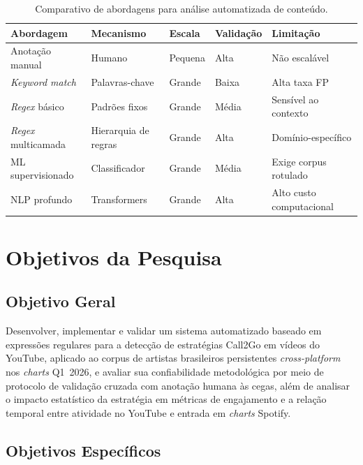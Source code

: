 ﻿\documentclass[12pt]{article}
\begin{document}
\begin{table}[H]
\centering
\caption{Comparativo de abordagens para análise automatizada de conteúdo.}
\label{tab:literatura}
\renewcommand{\arraystretch}{1.1}
\begin{tabular}{@{}lllll@{}}
\toprule
\textbf{Abordagem} & \textbf{Mecanismo} & \textbf{Escala} &
\textbf{Validação} & \textbf{Limitação} \\
\midrule
Anotação manual         & Humano              & Pequena & Alta   & Não escalável \\
\textit{Keyword match}  & Palavras-chave      & Grande  & Baixa  & Alta taxa FP \\
\textit{Regex} básico   & Padrões fixos       & Grande  & Média  & Sensível ao contexto \\
\textit{Regex} multicamada & Hierarquia de regras & Grande & Alta & Domínio-específico \\
ML supervisionado       & Classificador       & Grande  & Média  & Exige corpus rotulado \\
NLP profundo            & Transformers        & Grande  & Alta   & Alto custo computacional \\
\bottomrule
\end{tabular}
\end{table}

\section{Objetivos da Pesquisa}
\label{sec:objetivos}

\subsection{Objetivo Geral}

Desenvolver, implementar e validar um sistema automatizado baseado em
expressões regulares para a detecção de estratégias Call2Go em vídeos do
YouTube, aplicado ao corpus de artistas brasileiros persistentes
\textit{cross-platform} nos \textit{charts} Q1~2026, e avaliar sua
confiabilidade metodológica por meio de protocolo de validação cruzada com
anotação humana às cegas, além de analisar o impacto estatístico da
estratégia em métricas de engajamento e a relação temporal entre atividade
no YouTube e entrada em \textit{charts} Spotify.

\subsection{Objetivos Específicos}
\end{document}
